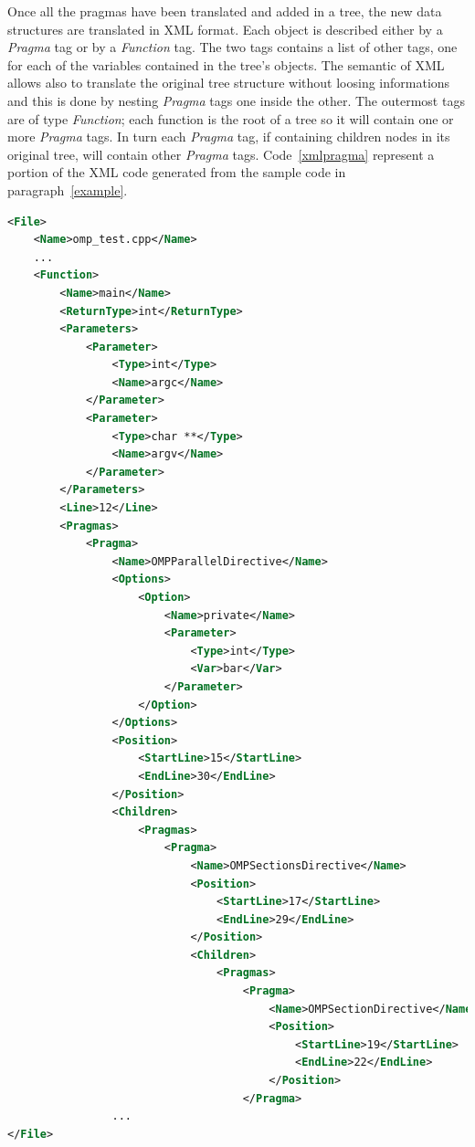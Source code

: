 \documentclass[a4paper,11pt,oneside]{book}
\begin{document}
Once all the pragmas have been translated and added in a tree, the new data structures are translated in XML format. Each object is described either by a \emph{Pragma} tag or by a \emph{Function} tag. The two tags contains a list of other tags, one for  each of the variables contained in the tree’s objects. The semantic of XML allows also to translate the original tree structure without loosing informations and this is done by nesting \emph{Pragma} tags one inside the other. The outermost tags are of type \emph{Function}; each function is the root of a tree so it will contain one or more \emph{Pragma} tags. In turn each \emph{Pragma} tag, if containing children nodes in its original tree, will contain other \emph{Pragma} tags. Code~\ref{xmlpragma} represent a portion of the XML code generated from the sample code in paragraph~\ref{example}.

\begin{lstlisting}[language=XML, caption=XML file of the pragma structure of Code~\ref{code}., label=xmlpragma]
<File>
    <Name>omp_test.cpp</Name>    
    ...
    <Function>
        <Name>main</Name>
        <ReturnType>int</ReturnType>
        <Parameters>
            <Parameter>
                <Type>int</Type>
                <Name>argc</Name>
            </Parameter>
            <Parameter>
                <Type>char **</Type>
                <Name>argv</Name>
            </Parameter>
        </Parameters>
        <Line>12</Line>
        <Pragmas>
            <Pragma>
                <Name>OMPParallelDirective</Name>
                <Options>
                    <Option>
                        <Name>private</Name>
                        <Parameter>
                            <Type>int</Type>
                            <Var>bar</Var>
                        </Parameter>
                    </Option>
                </Options>
                <Position>
                    <StartLine>15</StartLine>
                    <EndLine>30</EndLine>
                </Position>
                <Children>
                    <Pragmas>
                        <Pragma>
                            <Name>OMPSectionsDirective</Name>
                            <Position>
                                <StartLine>17</StartLine>
                                <EndLine>29</EndLine>
                            </Position>
                            <Children>
                                <Pragmas>
                                    <Pragma>
                                        <Name>OMPSectionDirective</Name>
                                        <Position>
                                            <StartLine>19</StartLine>
                                            <EndLine>22</EndLine>
                                        </Position>
                                    </Pragma>
				...
</File>
\end{lstlisting}
\end{document}
